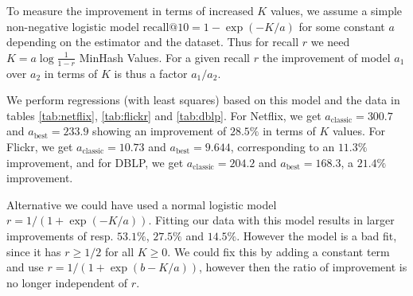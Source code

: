 To measure the improvement in terms of increased $K$ values,
we assume a simple non-negative logistic model $\text{recall@10} = 1 - \exp(-K/a)$ for some constant $a$ depending on the estimator and the dataset.
Thus for recall $r$ we need $K=a\log\frac1{1-r}$ MinHash Values.
For a given recall $r$ the improvement of model $a_1$ over $a_2$ in terms of $K$ is thus a factor $a_1/a_2$.

We perform regressions (with least squares) based on this model and the data in tables \ref{tab:netflix}, \ref{tab:flickr} and \ref{tab:dblp}.
For Netflix, we get $a_\text{classic}=300.7$ and $a_\text{best} = 233.9$ showing an improvement of $28.5\%$ in terms of $K$ values.
For Flickr, we get $a_\text{classic}=10.73$ and $a_\text{best} = 9.644$, corresponding to an $11.3\%$ improvement,
and for DBLP, we get $a_\text{classic}=204.2$ and $a_\text{best}=168.3$, a $21.4\%$ improvement.

Alternative we could have used a normal logistic model $r = 1/(1 + \exp(-K/a))$.
Fitting our data with this model results in larger improvements of resp. $53.1\%$, $27.5\%$ and $14.5\%$.
However the model is a bad fit, since it has $r\ge 1/2$ for all $K\ge 0$.
We could fix this by adding a constant term and use $r=1/(1+\exp(b-K/a))$, however then the ratio of improvement is no longer independent of $r$.




%

